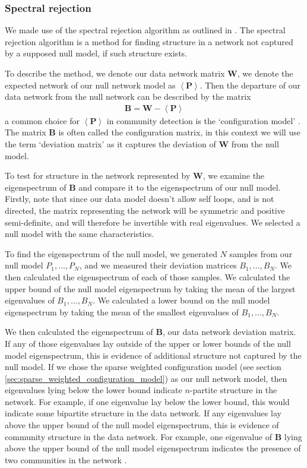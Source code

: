 \documentclass[a4paper,12pt]{article}
\theoremstyle{definition}
\begin{document}
        \subsubsection{Spectral rejection}\label{sec:spectral_rejection}
        We made use of the spectral rejection algorithm as outlined in \cite{humphries}. The spectral rejection algorithm is a method for finding structure in a network not captured by a supposed null model, if such structure exists.

        To describe the method, we denote our data network matrix $\mathbf{W}$, we denote the expected network of our null network model as $\left\langle \mathbf{P} \right\rangle$. Then the departure of our data network from the null network can be described by the matrix
        \begin{align}
          \mathbf{B} = \mathbf{W} - \left\langle \mathbf{P} \right\rangle
        \end{align}
        a common choice for $\left\langle \mathbf{P} \right\rangle$ in community detection is the `configuration model' \cite{fosdick, humphries2}. The matrix $\mathbf{B}$ is often called the configuration matrix, in this context we will use the term `deviation matrix' as it captures the deviation of $\mathbf{W}$ from the null model.

        To test for structure in the network represented by $\mathbf{W}$, we examine the eigenspectrum of $\mathbf{B}$ and compare it to the eigenspectrum of our null model. Firstly, note that since our data model doesn't allow self loops, and is not directed, the matrix representing the network will be symmetric and positive semi-definite, and will therefore be invertible with real eigenvalues. We selected a null model with the same characteristics.

        To find the eigenspectrum of the null model, we generated $N$ samples from our null model $P_1, \dots, P_N$, and we measured their deviation matrices $B_1, \dots, B_N$. We then calculated the eigenspectrum of each of those samples. We calculated the upper bound of the null model eigenspectrum by taking the mean of the largest eigenvalues of $B_1, \dots, B_N$. We calculated a lower bound on the null model eigenspectrum by taking the mean of the smallest eigenvalues of $B_1, \dots, B_N$.

        We then calculated the eigenspectrum of $\mathbf{B}$, our data network deviation matrix. If any of those eigenvalues lay outside of the upper or lower bounds of the null model eigenspectrum, this is evidence of additional structure not captured by the null model. If we chose the sparse weighted configuration model (see section \ref{sec:sparse_weighted_configuration_model}) as our null network model, then eigenvalues lying below the lower bound indicate $n$-partite structure in the network. For example, if one eigenvalue lay below the lower bound, this would indicate some bipartite structure in the data network. If any eigenvalues lay above the upper bound of the null model eigenspectrum, this is evidence of community structure in the data network. For example, one eigenvalue of $\mathbf{B}$ lying above the upper bound of the null model eigenspectrum indicates the presence of two communities in the network \cite{humphries2}.
\end{document}
